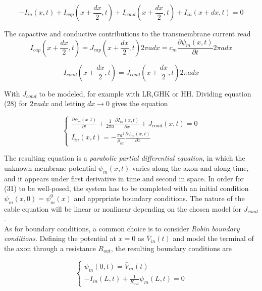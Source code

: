 \documentclass[a4paper]{article}
\begin{document}
\begin{equation}
- I_{in}(x,t) + I_{cap}(x+\frac{dx}{2},t) + I_{cond}(x+\frac{dx}{2},t) + I_{in}(x+dx,t) = 0
\end{equation}

The capactive and conductive contributions to the transmembrane current read
\begin{equation}
I_{cap}(x+\frac{dx}{2},t) = J_{cap}(x+\frac{dx}{2},t) 2 \pi a dx = c_m \frac{\partial \psi_m(x,t)}{\partial t} 2 \pi a dx 
\end{equation}

\begin{equation}
I_{cond}(x+\frac{dx}{2},t) = J_{cond}(x+\frac{dx}{2},t) 2 \pi a dx 
\end{equation}

With $J_{cond}$ to be modeled, for example with LR,GHK or HH. Dividing equation (28)  for $2 \pi a dx $ and letting $dx \rightarrow 0$ gives the equation

\begin{equation}
\begin{cases}
\frac{\partial \psi_m(x,t)}{\partial t} + \frac{1}{2 \pi a }\frac{\partial I_{in}(x,t)}{\partial x} + J_{cond}(x,t) = 0 \\
I_{in}(x,t) = -\frac{\pi a^2}{\rho_{ax}}\frac{\partial \psi_m(x,t)}{\partial x}
\end{cases}
\end{equation}

The resulting equation is a \textit{parabolic partial differential equation}, in which the unknown membrane potential $\psi_m(x,t) $ varies along the axon and along time, and it appears under first derivative in time and second in space. In order for (31) to be well-posed, the system has to be completed with an initial condition $ \psi_m (x,0) = \psi_m^0(x)$ and apprpriate boundary conditions. The nature of the cable equation will be linear or nonlinear depending on the chosen model for $J_{cond}$.\\
As for boundary conditions, a common choice is to consider \textit{Robin boundary conditions}. Defining the potential at $x=0$ as $\bar{V}_{in}(t)$ and model the terminal of the axon through a resistance $R_{out}$, the resulting boundary conditions are

\begin{equation}
\begin{cases}
\psi_m(0,t) = \bar{V}_{in}(t) \\
-I_{in}(L,t) +\frac{1}{R_{out}}\psi_m(L,t) =0
\end{cases}
\end{equation}
\end{document}
